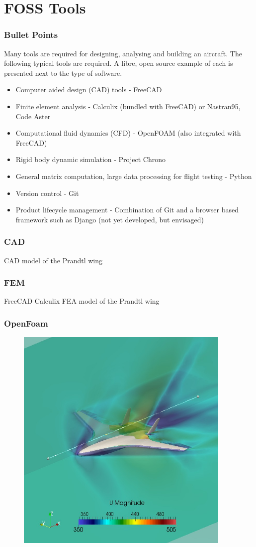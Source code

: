 \documentclass{beamer}
\begin{document}
\section{FOSS Tools}


\begin{frame}
\frametitle{Bullet Points}

Many tools are required for designing, analysing and building an aircraft.  The following typical tools are required.  A libre, open source example of each is presented next to the type of software.

\begin{itemize}
\item Computer aided design (CAD) tools - FreeCAD
\item Finite element analysis - Calculix (bundled with FreeCAD) or Nastran95, Code Aster
\item Computational fluid dynamics (CFD) - OpenFOAM (also integrated with FreeCAD)
\item Rigid body dynamic simulation - Project Chrono
\item General matrix computation, large data processing for flight testing - Python
\item Version control - Git
\item Product lifecycle management - Combination of Git and a browser based framework such as Django (not yet developed, but envisaged)
\end{itemize}
\end{frame}

\begin{frame}
\frametitle{CAD}

CAD model of the Prandtl wing

\end{frame}


\begin{frame}
\frametitle{FEM}

FreeCAD Calculix FEA model of the Prandtl wing

\end{frame}

\begin{frame}
\frametitle{OpenFoam}

\begin{figure}
\includegraphics[width=0.4\linewidth]{Pictures/OpenFoamBWB.png}
\end{figure}

\end{frame}
\end{document}
